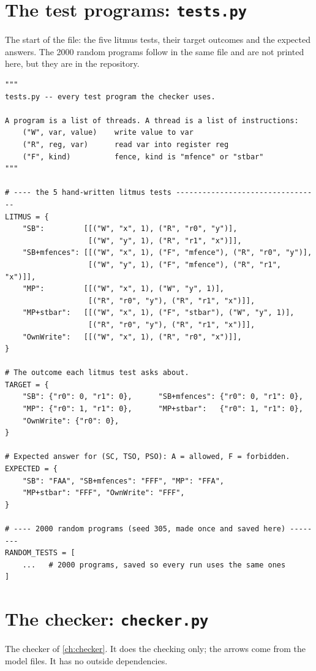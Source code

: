 \section{The test programs: \texttt{tests.py}}
The start of the file: the five litmus tests, their target outcomes and the expected answers. The 2000 random programs follow in the same file and are not printed here, but they are in the repository.

\begin{lstlisting}[style=vspython]
"""
tests.py -- every test program the checker uses.

A program is a list of threads. A thread is a list of instructions:
    ("W", var, value)    write value to var
    ("R", reg, var)      read var into register reg
    ("F", kind)          fence, kind is "mfence" or "stbar"
"""

# ---- the 5 hand-written litmus tests ---------------------------------
LITMUS = {
    "SB":         [[("W", "x", 1), ("R", "r0", "y")],
                   [("W", "y", 1), ("R", "r1", "x")]],
    "SB+mfences": [[("W", "x", 1), ("F", "mfence"), ("R", "r0", "y")],
                   [("W", "y", 1), ("F", "mfence"), ("R", "r1", "x")]],
    "MP":         [[("W", "x", 1), ("W", "y", 1)],
                   [("R", "r0", "y"), ("R", "r1", "x")]],
    "MP+stbar":   [[("W", "x", 1), ("F", "stbar"), ("W", "y", 1)],
                   [("R", "r0", "y"), ("R", "r1", "x")]],
    "OwnWrite":   [[("W", "x", 1), ("R", "r0", "x")]],
}

# The outcome each litmus test asks about.
TARGET = {
    "SB": {"r0": 0, "r1": 0},      "SB+mfences": {"r0": 0, "r1": 0},
    "MP": {"r0": 1, "r1": 0},      "MP+stbar":   {"r0": 1, "r1": 0},
    "OwnWrite": {"r0": 0},
}

# Expected answer for (SC, TSO, PSO): A = allowed, F = forbidden.
EXPECTED = {
    "SB": "FAA", "SB+mfences": "FFF", "MP": "FFA",
    "MP+stbar": "FFF", "OwnWrite": "FFF",
}

# ---- 2000 random programs (seed 305, made once and saved here) --------
RANDOM_TESTS = [
    ...   # 2000 programs, saved so every run uses the same ones
]
\end{lstlisting}

\section{The checker: \texttt{checker.py}}
The checker of \cref{ch:checker}. It does the checking only; the arrows come from the model files. It has no outside dependencies.

